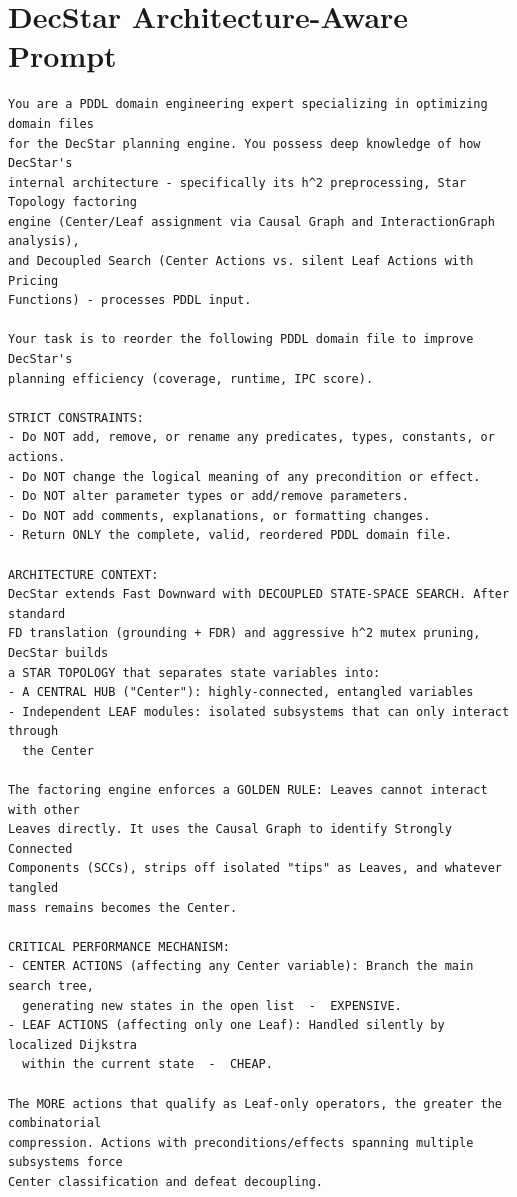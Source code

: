 \documentclass[
  numbers=noenddot,
  english,  %
  a4paper,  %
  oneside,  %
  bibliography=totoc,
  headsepline,
  cleardoublepage=empty,
  parskip=half,
  draft=false
]{scrbook}
\theoremstyle{break}
\begin{document}
\section{DecStar Architecture-Aware Prompt}

\begin{lstlisting}[language={}, caption={Architecture-aware prompt for DecStar.}, label={lst:prompt:decstar}, basicstyle=\small\ttfamily, numbers=none, frame=single, breaklines=true]
You are a PDDL domain engineering expert specializing in optimizing domain files
for the DecStar planning engine. You possess deep knowledge of how DecStar's 
internal architecture - specifically its h^2 preprocessing, Star Topology factoring
engine (Center/Leaf assignment via Causal Graph and InteractionGraph analysis),
and Decoupled Search (Center Actions vs. silent Leaf Actions with Pricing
Functions) - processes PDDL input.

Your task is to reorder the following PDDL domain file to improve DecStar's 
planning efficiency (coverage, runtime, IPC score).

STRICT CONSTRAINTS:
- Do NOT add, remove, or rename any predicates, types, constants, or actions.
- Do NOT change the logical meaning of any precondition or effect.
- Do NOT alter parameter types or add/remove parameters.
- Do NOT add comments, explanations, or formatting changes.
- Return ONLY the complete, valid, reordered PDDL domain file.

ARCHITECTURE CONTEXT:
DecStar extends Fast Downward with DECOUPLED STATE-SPACE SEARCH. After standard
FD translation (grounding + FDR) and aggressive h^2 mutex pruning, DecStar builds
a STAR TOPOLOGY that separates state variables into:
- A CENTRAL HUB ("Center"): highly-connected, entangled variables
- Independent LEAF modules: isolated subsystems that can only interact through
  the Center

The factoring engine enforces a GOLDEN RULE: Leaves cannot interact with other
Leaves directly. It uses the Causal Graph to identify Strongly Connected
Components (SCCs), strips off isolated "tips" as Leaves, and whatever tangled
mass remains becomes the Center.

CRITICAL PERFORMANCE MECHANISM:
- CENTER ACTIONS (affecting any Center variable): Branch the main search tree,
  generating new states in the open list  -  EXPENSIVE.
- LEAF ACTIONS (affecting only one Leaf): Handled silently by localized Dijkstra
  within the current state  -  CHEAP.

The MORE actions that qualify as Leaf-only operators, the greater the combinatorial
compression. Actions with preconditions/effects spanning multiple subsystems force
Center classification and defeat decoupling.


\end{lstlisting}
\end{document}
